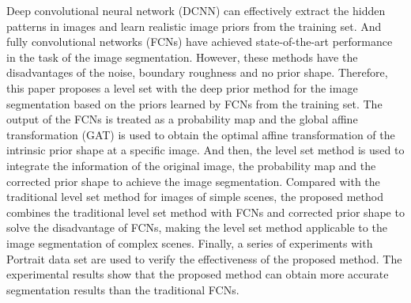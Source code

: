 Deep convolutional neural network (DCNN) can effectively extract the hidden patterns in images and learn realistic image priors from the training set. And fully convolutional networks (FCNs) have achieved state-of-the-art performance in the task of the image segmentation. However, these methods have the disadvantages of the noise, boundary roughness and no prior shape. Therefore, this paper proposes a level set with the deep prior method for the image segmentation based on the priors learned by FCNs from the training set. The output of the FCNs is treated as a probability map and the global affine transformation (GAT) is used to obtain the optimal affine transformation of the intrinsic prior shape at a specific image. And then, the level set method is used to integrate the information of the original image, the probability map and the corrected prior shape to achieve the image segmentation. Compared with the traditional level set method for images of simple scenes, the proposed method combines the traditional level set method with FCNs and corrected prior shape to solve the disadvantage of FCNs, making the level set method applicable to the image segmentation of complex scenes. Finally, a series of experiments with Portrait data set are used to verify the effectiveness of the proposed method. The experimental results show that the proposed method can obtain more accurate segmentation results than the traditional FCNs.
